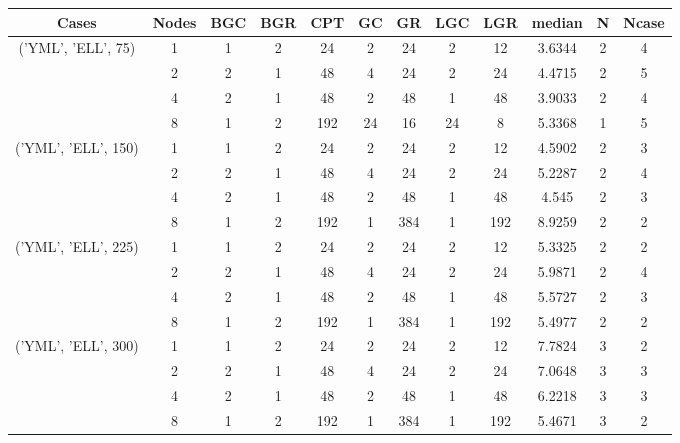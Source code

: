 \begin{tabular}{cccccccccccc}
\hline
Cases & Nodes& BGC& BGR& CPT& GC& GR& LGC& LGR& median & N & Ncase \\
\hline
\multirow{4}{*}{('YML', 'ELL', 75)}& 1& 1& 2& 24& 2& 24& 2& 12& 3.6344& 2& 4\\
& 2& 2& 1& 48& 4& 24& 2& 24& 4.4715& 2& 5\\
& 4& 2& 1& 48& 2& 48& 1& 48& 3.9033& 2& 4\\
& 8& 1& 2& 192& 24& 16& 24& 8& 5.3368& 1& 5\\
\hline
\multirow{4}{*}{('YML', 'ELL', 150)}& 1& 1& 2& 24& 2& 24& 2& 12& 4.5902& 2& 3\\
& 2& 2& 1& 48& 4& 24& 2& 24& 5.2287& 2& 4\\
& 4& 2& 1& 48& 2& 48& 1& 48& 4.545& 2& 3\\
& 8& 1& 2& 192& 1& 384& 1& 192& 8.9259& 2& 2\\
\hline
\multirow{4}{*}{('YML', 'ELL', 225)}& 1& 1& 2& 24& 2& 24& 2& 12& 5.3325& 2& 2\\
& 2& 2& 1& 48& 4& 24& 2& 24& 5.9871& 2& 4\\
& 4& 2& 1& 48& 2& 48& 1& 48& 5.5727& 2& 3\\
& 8& 1& 2& 192& 1& 384& 1& 192& 5.4977& 2& 2\\
\hline
\multirow{4}{*}{('YML', 'ELL', 300)}& 1& 1& 2& 24& 2& 24& 2& 12& 7.7824& 3& 2\\
& 2& 2& 1& 48& 4& 24& 2& 24& 7.0648& 3& 3\\
& 4& 2& 1& 48& 2& 48& 1& 48& 6.2218& 3& 3\\
& 8& 1& 2& 192& 1& 384& 1& 192& 5.4671& 3& 2\\
\hline
\end{tabular}



